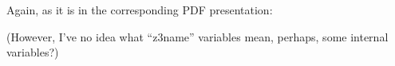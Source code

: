 Again, as it is in the corresponding PDF presentation:

\begin{figure}[H]
\centering
{}
\end{figure}

(However, I've no idea what ``z3name'' variables mean, perhaps, some internal variables?)

